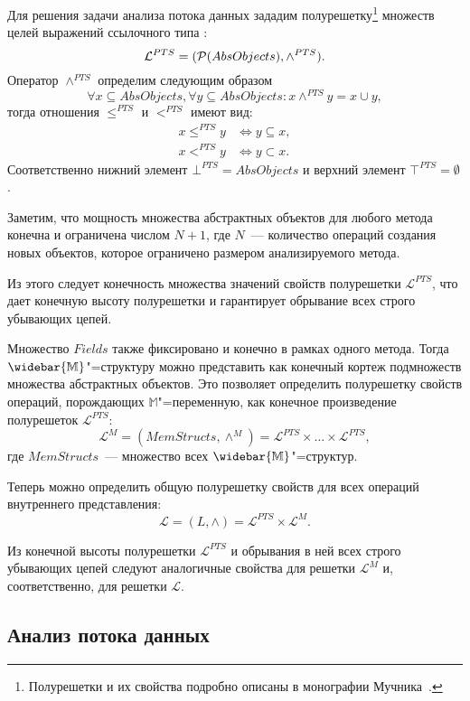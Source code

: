\documentclass[14pt,titlepage,draft]{extarticle}
\newcommand{\M}{\ensuremath{\mathbb{M}}}
\newcommand{\Ms}{\ensuremath{\mathbb{\widebar{M}}}}
\newcommand{\Lattice}{\mathcal{L}}
\newcommand{\meet}{\wedge}
\begin{document}
    Для решения задачи анализа потока данных зададим полурешетку\footnote{
      Полурешетки и их свойства подробно описаны в монографии
      Мучника~\cite{muchnick}.
    }
    множеств целей выражений ссылочного типа :
    \[ \Lattice^{PTS} = (\powerset{AbsObjects}, \meet^{PTS}).\]
    Оператор $\meet^{PTS}$ определим следующим образом
    \[
      \forall x \subseteq AbsObjects, \forall y \subseteq AbsObjects
      \colon
      x \meet^{PTS} y = x \cup y,
    \]
    тогда отношения $\leq^{PTS}$ и $<^{PTS}$ имеют вид:
    \begin{align*}
      x \leq^{PTS} y &\Leftrightarrow y \subseteq x, \\
      x <^{PTS} y &\Leftrightarrow y \subset x.
    \end{align*}
    Соответственно нижний элемент $\bot^{PTS} = AbsObjects$
    и верхний элемент $\top^{PTS} = \emptyset$.

    Заметим, что мощность множества абстрактных объектов для любого
    метода конечна и ограничена числом $N + 1$,
    где $N$~--- количество операций создания новых объектов, которое ограничено
    размером анализируемого метода.

    Из этого следует конечность множества значений свойств полурешетки
    $\Lattice^{PTS}$, что дает конечную высоту полурешетки и гарантирует
    обрывание всех строго убывающих цепей.

    Множество $Fields$ также фиксировано и конечно в рамках одного метода.
    Тогда \Ms"=структуру можно представить как конечный кортеж подмножеств
    множества абстрактных объектов.
    Это позволяет определить полурешетку свойств операций, порождающих
    \M"=переменную, как конечное произведение полурешеток $\Lattice^{PTS}$:
    \[\Lattice^M = (MemStructs, \meet^M) =
      \Lattice^{PTS} \times \ldots \times \Lattice^{PTS},\]
    где $MemStructs$~--- множество всех \Ms"=структур.

    Теперь можно определить общую полурешетку свойств для всех операций
    внутреннего представления:
    \[ \Lattice = (L, \meet) = \Lattice^{PTS} \times \Lattice^M. \]

    Из конечной высоты полурешетки $\Lattice^{PTS}$
    и обрывания в ней всех строго убывающих цепей следуют аналогичные свойства
    для решетки $\Lattice^M$ и, соответственно, для решетки $\Lattice$.

  \subsection{Анализ потока данных}
\end{document}
